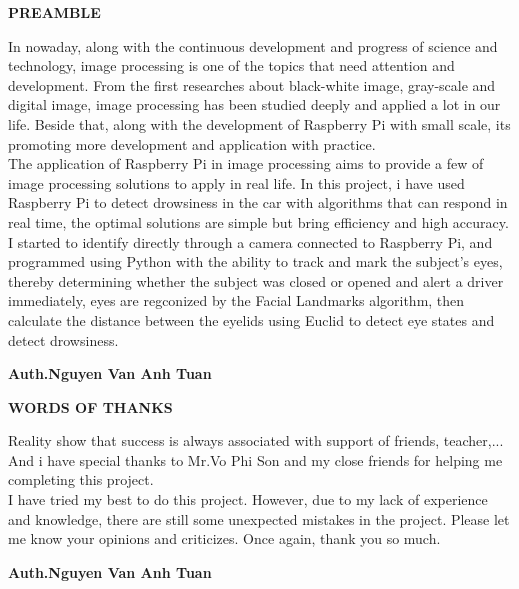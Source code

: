 \documentclass[a4paper,13pt]{report}
\begin{document}
    \newpage
    \thispagestyle{plain}
    \centering
    \justifying
    \centerline{\textbf{\huge{PREAMBLE}}}
    \vspace{10mm}
    \begin{flushleft}
        In nowaday, along with the continuous development and progress of science and technology, image processing is 
        one of the topics that need attention and development. From the first researches about black-white image, 
        gray-scale and digital image, image processing has been studied deeply and applied a lot in our life. Beside that, 
        along with the development of Raspberry Pi with small scale, its promoting more development and application with 
        practice. \\ 
        \vspace{2mm}
        The application of Raspberry Pi in image processing aims to provide a few of image processing solutions to apply in 
        real life. In this project, i have used Raspberry Pi to detect drowsiness in the car with algorithms that can respond 
        in real time, the optimal solutions are simple but bring efficiency and high accuracy. I started to identify directly 
        through a camera connected to Raspberry Pi, and programmed using Python with the ability to track and mark the subject's 
        eyes, thereby determining whether the subject was closed or opened and alert a driver immediately, eyes are regconized by 
        the Facial Landmarks algorithm, then calculate the distance between the eyelids using Euclid to detect eye states and detect 
        drowsiness.
    \end{flushleft}
    \begin{flushright}
        \textbf{Auth.Nguyen Van Anh Tuan}
    \end{flushright}

    \newpage
    \thispagestyle{plain}
    \centering
    \justifying
    \centerline{\textbf{\huge{WORDS OF THANKS}}}
    \vspace{10mm}
    \begin{flushleft}
        Reality show that success is always associated with support of friends, teacher,... And i have special thanks to Mr.Vo Phi Son and my close friends 
        for helping me completing this project. \\ 
        \vspace{2mm}
        I have tried my best to do this project. However, due to my lack of experience and 
        knowledge, there are still some unexpected mistakes in the project. Please let me know your opinions and criticizes.
        Once again, thank you so much. 
    \end{flushleft}
    \begin{flushright}
        \textbf{Auth.Nguyen Van Anh Tuan}
    \end{flushright}
\end{document}

